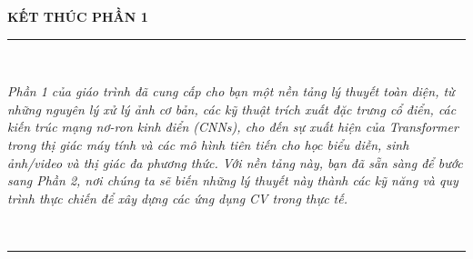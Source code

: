 \clearpage
\thispagestyle{empty}

\begin{center}
	\vspace*{4cm}
	{\Huge \textbf{KẾT THÚC PHẦN 1}} \\[1.5cm]
	
	\rule{0.8\textwidth}{0.4pt} \\[0.8cm]
	
	\parbox{0.9\textwidth}{
		\centering
		\textit{
			Phần 1 của giáo trình đã cung cấp cho bạn một nền tảng lý thuyết toàn diện, 
			từ những nguyên lý xử lý ảnh cơ bản, các kỹ thuật trích xuất đặc trưng cổ điển, 
			các kiến trúc mạng nơ-ron kinh điển (CNNs), cho đến sự xuất hiện của Transformer 
			trong thị giác máy tính và các mô hình tiên tiến cho học biểu diễn, 
			sinh ảnh/video và thị giác đa phương thức. Với nền tảng này, bạn đã sẵn sàng 
			để bước sang Phần 2, nơi chúng ta sẽ biến những lý thuyết này thành các kỹ năng 
			và quy trình thực chiến để xây dựng các ứng dụng CV trong thực tế.
		}
	} \\[1cm]
	
	\rule{0.8\textwidth}{0.4pt} \\[2cm]
\end{center}